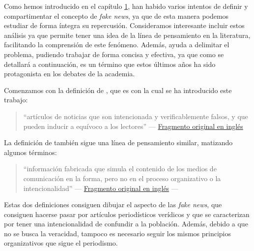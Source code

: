 \label{sec:defs}

Como hemos introducido en el capítulo \hyperref[chapter:1]{1}, han habido varios intentos de definir y compartimentar el concepto de \emph{fake news}, ya que de esta manera podemos estudiar de forma íntegra su repercusión. Consideramos interesante incluir estos análisis ya que permite tener una idea de la línea de pensamiento en la literatura, facilitando la comprensión de este fenómeno. Además, ayuda a delimitar el problema, pudiendo trabajar de forma concisa y efectiva, ya que como se detallará a continuación, es un término que estos últimos años ha sido protagonista en los debates de la academia. 



Comenzamos con la definición de \citet{AlcottGentzkow2017}, que es con la cual se ha introducido este trabajo:

\label{frag1esp}
\begin{quotation}
     ``artículos de noticias que son intencionada y verificablemente falsos, y que pueden inducir a equívoco a los lectores'' --- \hyperref[frag1eng]{Fragmento original en inglés}
\end{quotation}

La definición de \citet{Lazer2018} también sigue una línea de pensamiento similar, matizando algunos términos:

\label{frag2esp}
\begin{quotation}
    ``información fabricada que simula el contenido de los medios de comunicación en la forma, pero no en el proceso organizativo o la intencionalidad''  --- \hyperref[frag2eng]{Fragmento original en inglés}
    --- 
\end{quotation}

Estas dos definiciones consiguen dibujar el aspecto de las \emph{fake news}, que consiguen hacerse pasar por artículos periodísticos verídicos y que se caracterizan por tener una intencionalidad de confundir a la población. Además, debido a que no se busca la veracidad, tampoco es necesario seguir los mismos principios organizativos que sigue el periodismo.

